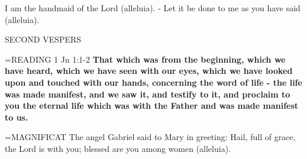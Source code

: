 I am the handmaid of the Lord (alleluia).
- Let it be done to me as you have said (alleluia).

\begin{flushleft}\normalsize SECOND VESPERS\\\end{flushleft}

\hangindent=\parindent \small{READING} 1 Jn 1:1-2 \textbf{That which was from the beginning, which we
have heard, which we have seen with our eyes, which we have
looked upon and touched with our hands, concerning the word of
life - the life was made manifest, and we saw it, and testify to it, and
proclaim to you the eternal life which was with the Father and was
made manifest to us.\\}
 
\hangindent=\parindent \small{MAGNIFICAT  The angel Gabriel said to Mary in greeting: Hail, full
of grace, the Lord is with you; blessed are you among women
(alleluia).\\}
 


